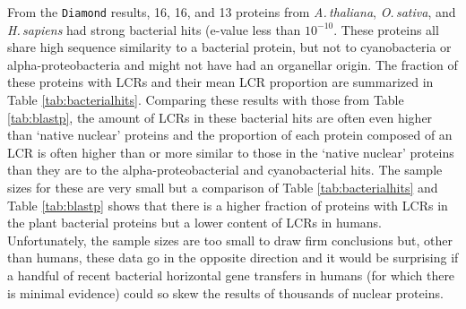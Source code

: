 \documentclass[a4paper,12pt]{article}
\newcommand{\ath}{\mbox{\textit{A.\,thaliana}}\xspace}
\newcommand{\osa}{\mbox{\textit{O.\,sativa}}\xspace}
\newcommand{\hsa}{\mbox{\textit{H.\,sapiens}}\xspace}
\renewcommand{\diamond}{\mbox{\texttt{Diamond}}\xspace}
\begin{document}
\begin{multicols}{2}
From the \diamond results, 16, 16, and 13 proteins from \ath,
\osa, and \hsa had strong bacterial hits (e-value less than
$10^{-10}$. These proteins all share high sequence similarity to a
bacterial protein, but not to cyanobacteria or alpha-proteobacteria
and might not have had an organellar origin.  The fraction of these
proteins with LCRs and their mean LCR proportion are summarized in Table
\ref{tab:bacterialhits}. Comparing these results with those from
Table \ref{tab:blastp}, the amount of LCRs in these bacterial hits
are often even higher than `native nuclear' proteins and the proportion
of each protein composed of an LCR is often higher than or more
similar to those in the `native nuclear' proteins than they are to the
alpha-proteobacterial and cyanobacterial hits.  The sample sizes for
these are very small but a comparison of Table \ref{tab:bacterialhits}
and Table \ref{tab:blastp} shows that there is a higher fraction of
proteins with LCRs in the plant bacterial proteins but a lower content of
LCRs in humans.  Unfortunately, the sample sizes are too small to draw
firm conclusions but, other than humans, these data go in the opposite
direction and it would be surprising if a handful of recent bacterial
horizontal gene transfers in humans (for which there is minimal evidence)
could so skew the results of thousands of nuclear proteins.



\end{multicols}
\end{document}
